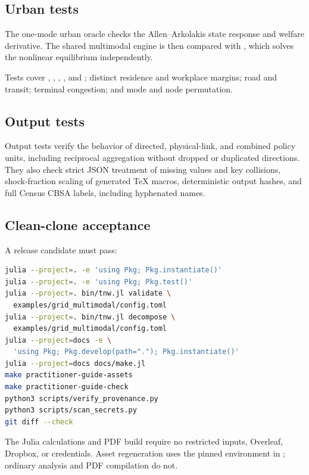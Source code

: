\subsection{Urban tests}

The one-mode urban oracle checks the Allen--Arkolakis state response and
welfare derivative. The shared multimodal engine is then compared with
, which solves the nonlinear equilibrium independently.

Tests cover , , , , and ;
distinct residence and workplace margins; road and transit; terminal
congestion; and mode and node permutation.

\subsection{Output tests}

Output tests verify the behavior of directed, physical-link, and combined policy
units, including reciprocal aggregation without dropped or duplicated
directions. They also check strict JSON treatment of missing values and key
collisions, shock-fraction scaling of generated TeX macros, deterministic
output hashes, and full Census CBSA labels, including hyphenated names.

\subsection{Clean-clone acceptance}

A release candidate must pass:
\begin{lstlisting}[language=bash]
julia --project=. -e 'using Pkg; Pkg.instantiate()'
julia --project=. -e 'using Pkg; Pkg.test()'
julia --project=. bin/tnw.jl validate \
  examples/grid_multimodal/config.toml
julia --project=. bin/tnw.jl decompose \
  examples/grid_multimodal/config.toml
julia --project=docs -e \
  'using Pkg; Pkg.develop(path="."); Pkg.instantiate()'
julia --project=docs docs/make.jl
make practitioner-guide-assets
make practitioner-guide-check
python3 scripts/verify_provenance.py
python3 scripts/scan_secrets.py
git diff --check
\end{lstlisting}
The Julia calculations and PDF build require no restricted inputs, Overleaf,
Dropbox, or credentials. Asset regeneration uses the pinned environment in
; ordinary analysis and PDF compilation do not.

